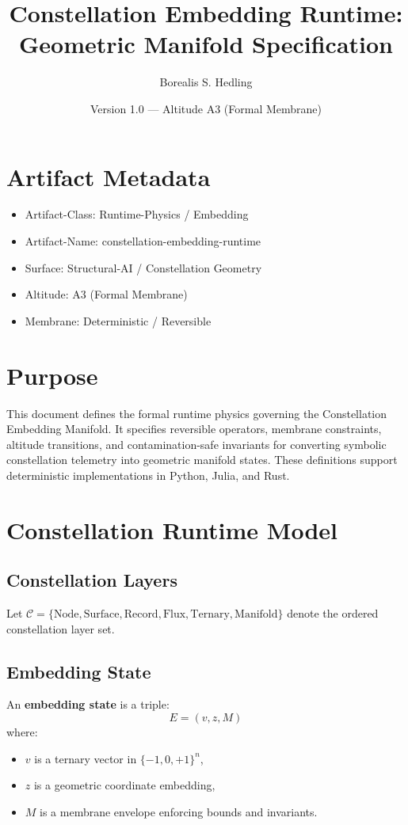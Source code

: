 \documentclass[12pt]{article}
\title{Constellation Embedding Runtime: Geometric Manifold Specification}
\author{Borealis S. Hedling}
\date{Version 1.0 — Altitude A3 (Formal Membrane)}
\begin{document}
\maketitle

\section*{Artifact Metadata}
\begin{itemize}
  \item Artifact-Class: Runtime-Physics / Embedding
  \item Artifact-Name: constellation-embedding-runtime
  \item Surface: Structural-AI / Constellation Geometry
  \item Altitude: A3 (Formal Membrane)
  \item Membrane: Deterministic / Reversible
\end{itemize}

\section{Purpose}
This document defines the formal runtime physics governing the
Constellation Embedding Manifold. It specifies reversible operators,
membrane constraints, altitude transitions, and contamination-safe
invariants for converting symbolic constellation telemetry into
geometric manifold states. These definitions support deterministic
implementations in Python, Julia, and Rust.

\section{Constellation Runtime Model}

\subsection{Constellation Layers}
Let $\mathcal{C} = \{\text{Node}, \text{Surface}, \text{Record},
\text{Flux}, \text{Ternary}, \text{Manifold}\}$ denote the ordered
constellation layer set.

\subsection{Embedding State}
An \textbf{embedding state} is a triple:
\[
E = (v, z, M)
\]
where:
\begin{itemize}
  \item $v$ is a ternary vector in $\{-1,0,+1\}^n$,
  \item $z$ is a geometric coordinate embedding,
  \item $M$ is a membrane envelope enforcing bounds and invariants.
\end{itemize}
\end{document}
